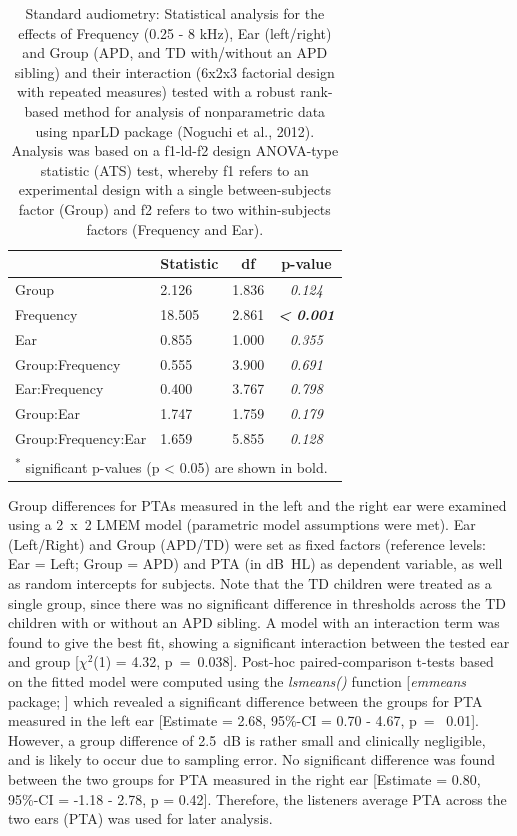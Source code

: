 \documentclass[a4paper, twoside]{templates/ociamthesis}
\begin{document}
\begin{table}

\caption{\label{tab:RegAud-TabnparLD}Standard audiometry: Statistical analysis for the effects of Frequency (0.25 - 8 kHz), Ear (left/right) and Group (APD, and TD with/without an APD sibling) and their interaction (6x2x3 factorial design with repeated measures) tested with a robust rank-based method for analysis of nonparametric data using nparLD package (Noguchi et al., 2012). Analysis was based on a f1-ld-f2 design ANOVA-type statistic (ATS) test, whereby f1 refers to an experimental design with a single between-subjects factor (Group) and f2 refers to two within-subjects factors (Frequency and Ear).}
\centering
\begin{tabular}[t]{llc>{}c}
\toprule
  & Statistic & df & p-value\\
\midrule
Group & 2.126 & 1.836 & \em{0.124}\\
Frequency & 18.505 & 2.861 & \em{\textbf{< 0.001}}\\
Ear & 0.855 & 1.000 & \em{0.355}\\
Group:Frequency & 0.555 & 3.900 & \em{0.691}\\
Ear:Frequency & 0.400 & 3.767 & \em{0.798}\\
Group:Ear & 1.747 & 1.759 & \em{0.179}\\
Group:Frequency:Ear & 1.659 & 5.855 & \em{0.128}\\
\bottomrule
\multicolumn{4}{l}{\textsuperscript{*} significant p-values (p < 0.05) are shown in bold.}\\
\end{tabular}
\end{table}

Group differences for PTAs measured in the left and the right ear were examined using a 2~x~2 LMEM model (parametric model assumptions were met). Ear (Left/Right) and Group (APD/TD) were set as fixed factors (reference levels: Ear = Left; Group = APD) and PTA (in dB~HL) as dependent variable, as well as random intercepts for subjects. Note that the TD children were treated as a single group, since there was no significant difference in thresholds across the TD children with or without an APD sibling. A model with an interaction term was found to give the best fit, showing a significant interaction between the tested ear and group {[}\(\chi^2\)(1) = 4.32, p~=~0.038{]}. Post-hoc paired-comparison t-tests based on the fitted model were computed using the \emph{lsmeans()} function {[}\emph{emmeans} package; \textcite{emmeansPackageR}{]} which revealed a significant difference between the groups for PTA measured in the left ear {[}Estimate = 2.68, 95\%-CI = 0.70 - 4.67, p~= ~0.01{]}. However, a group difference of 2.5~dB is rather small and clinically negligible, and is likely to occur due to sampling error. No significant difference was found between the two groups for PTA measured in the right ear {[}Estimate = 0.80, 95\%-CI = -1.18 - 2.78, p = 0.42{]}. Therefore, the listeners average PTA across the two ears (PTA) was used for later analysis.\\
\end{document}
